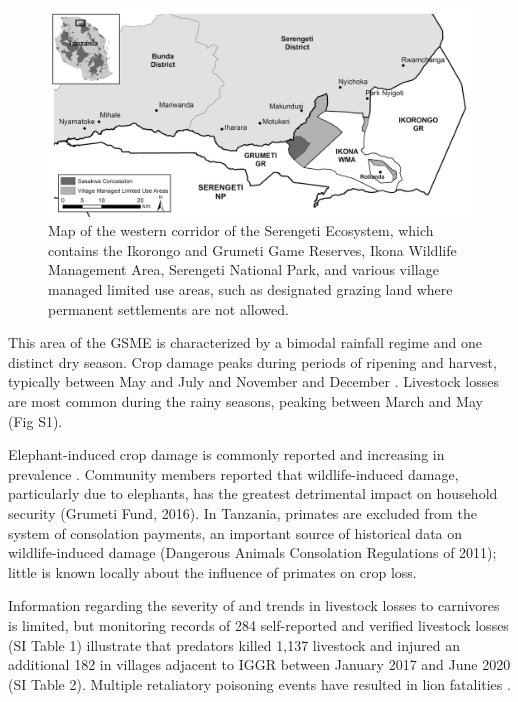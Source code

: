 \documentclass[12pt,]{article}
\begin{document}
\begin{figure}
    \centering
    \includegraphics[width=\textwidth]{Figures/Area.png} %
    \caption{Map of the western corridor of the Serengeti Ecosystem, which contains the Ikorongo and Grumeti Game Reserves, Ikona Wildlife Management Area, Serengeti National Park, and various village managed limited use areas, such as designated grazing land where permanent settlements are not allowed.}
    \label{fig:FigGrumContext}
\end{figure}


This area of the GSME is characterized by a bimodal rainfall regime and one distinct dry season. Crop damage peaks during periods of ripening and harvest, typically between May and July and November and December \citep{DenningerSnyder2019}. Livestock losses are most common during the rainy seasons, peaking between March and May (Fig S1). 

Elephant-induced crop damage is commonly reported and increasing in prevalence \citep{DenningerSnyder2019}. Community members reported that wildlife-induced damage, particularly due to elephants, has the greatest detrimental impact on household security (Grumeti Fund, 2016). In Tanzania, primates are excluded from the system of consolation payments, an important source of historical data on wildlife-induced damage (Dangerous Animals Consolation Regulations of 2011); little is known locally about the influence of primates on crop loss. 

Information regarding the severity of and trends in livestock losses to carnivores is limited, but monitoring records of 284 self-reported and verified livestock losses (SI Table 1) illustrate that predators killed 1,137 livestock and injured an additional 182 in villages adjacent to IGGR between January 2017 and June 2020 (SI Table 2). Multiple retaliatory poisoning events have resulted in lion fatalities \citep{Jacob2014, Tengo2018}.
\end{document}
